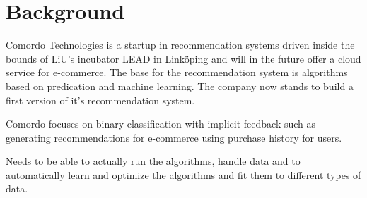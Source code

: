 
\chapter{Background}\label{cha:background}

Comordo Technologies is a startup in recommendation systems driven inside the bounds of LiU's incubator LEAD in Linköping and will in the future offer a cloud service for e-commerce. The base for the recommendation system is algorithms based on predication and machine learning. The company now stands to build a first version of it's recommendation system.

Comordo focuses on binary classification with implicit feedback such as generating recommendations for e-commerce using purchase history for users.


Needs to be able to actually run the algorithms, handle data and to automatically learn and optimize the algorithms and fit them to different types of data.


